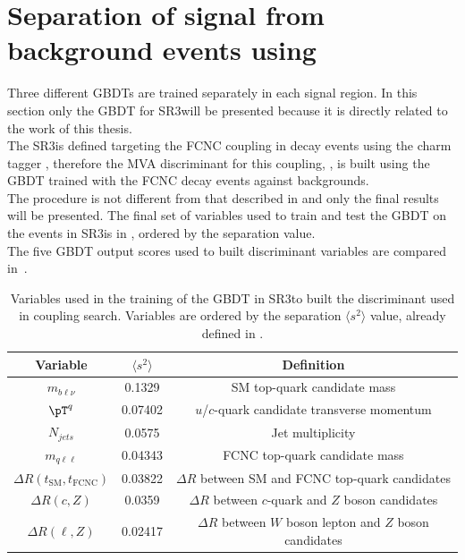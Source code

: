 \section{Separation of signal from background events using \DLrc}
\label{sec:separation_all}
Three different GBDTs are trained separately in each signal region.
In this section only the GBDT for SR3\tZc will be presented because it is directly related to the work of this thesis.\\
The SR3\tZc is defined targeting the FCNC \tZc coupling in \ttbar decay events using the charm tagger \DLrc, therefore the MVA discriminant for this coupling, \Dthree, is built using the GBDT trained with the FCNC \tZc \ttbar decay events against backgrounds.\\
The procedure is not different from that described in  and only the final results will be presented.
The final set of variables used to train and test the GBDT on the events in
SR3\tZc is in , ordered by the separation value.\\
The five GBDT output scores used to built discriminant variables are compared in~.\\
\begin{table}[!htbp]
	\small
	\centering
	\begin{tabular}{ccc}
		\toprule
		Variable & $\langle s^{2}\rangle$  & Definition \\
		\midrule
		$m_{b\ell\nu}$  &  0.1329  &  SM top-quark candidate mass  \\
		$\pT^{q}$  &  0.07402  &  $u$/$c$-quark candidate transverse momentum  \\
		$N_{jets}$  &  0.0575  &  Jet multiplicity  \\
		$m_{q\ell\ell}$  &  0.04343  &  FCNC top-quark candidate mass  \\
		$\Delta R(t_{\text{SM}},t_{\text{FCNC}})$  &  0.03822  &  $\Delta R$ between SM and FCNC top-quark candidates  \\
		$\Delta R(c,Z)$  &  0.0359  &  $\Delta R$ between $c$-quark and $Z$ boson candidates  \\
		$\Delta R(\ell,Z)$  &  0.02417  &  $\Delta R$ between $W$ boson lepton and $Z$ boson candidates  \\
		\bottomrule
	\end{tabular}
	\caption{ Variables used in the training of the GBDT in SR3\tZc to built the \Dthree discriminant used in \tZc coupling search. Variables are ordered by the separation 	$\langle s^{2}\rangle$ value, already defined in . }%
\label{tab:D3input_dl1rc}
\end{table}

